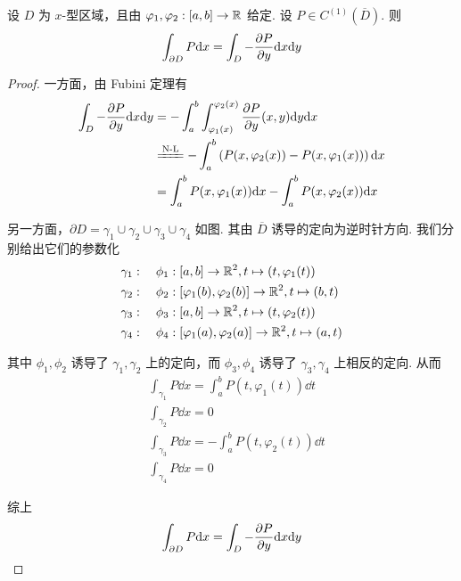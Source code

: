 \begin{lemma}
    设 $D$ 为 $x$-型区域，且由 $\varphi_1,\varphi_2:[a,b]\to\mathbb{R}$ 给定. 设 $P\in C^{(1)}(\overline{D})$. 则
$$
\int_{\partial D}P\mathrm{d} x=\int_D-\frac{\partial{P}}{\partial{y}}\mathrm{d} x\mathrm{d} y
$$
\end{lemma}
\begin{proof}
    一方面，由 Fubini 定理有
$$
\begin{aligned}
    \int_D-\pard{P}{y}\dd x\dd y&=-\int_a^b\int_{\varphi_1(x)}^{\varphi_2(x)}\pard{P}{y}(x,y)\dd y\dd x\\
    &\xlongequal{\text{N-L}}-\int_a^b\left(P(x,\varphi_2(x))-P(x,\varphi_1(x))\right)\dd x\\
    &=\int_a^b P(x,\varphi_1(x))\dd x-\int_a^b P(x,\varphi_2(x))\dd x
\end{aligned}
$$


    另一方面，$\partial D=\gamma_1\cup\gamma_2\cup\gamma_3\cup\gamma_4$ 如图. 其由 $\overline{D}$ 诱导的定向为逆时针方向. 我们分别给出它们的参数化
$$
\begin{aligned}
    &\gamma_1:\quad\phi_1:[a,b]\to\mathbb{R}^2,t\mapsto(t,\varphi_1(t))\\
    &\gamma_2:\quad\phi_2:[\varphi_1(b),\varphi_2(b)]\to\mathbb{R}^2,t\mapsto(b,t)\\
    &\gamma_3:\quad\phi_3:[a,b]\to\mathbb{R}^2,t\mapsto(t,\varphi_2(t))\\
    &\gamma_4:\quad\phi_4:[\varphi_1(a),\varphi_2(a)]\to\mathbb{R}^2,t\mapsto(a,t)\\
\end{aligned}
$$

    其中 $\phi_1,\phi_2$ 诱导了 $\gamma_1,\gamma_2$ 上的定向，而 $\phi_3,\phi_4$ 诱导了 $\gamma_3,\gamma_4$ 上相反的定向. 从而
$$
\begin{aligned}
    &\int_{\gamma_1}P\dd x=\int_a^bP(t,\varphi_1(t))\dd t\\
    &\int_{\gamma_2}P\dd x=0\\
    &\int_{\gamma_3}P\dd x=-\int_a^bP(t,\varphi_2(t))\dd t\\
    &\int_{\gamma_4}P\dd x=0
\end{aligned}
$$

    综上
$$
\int_{\partial D}P\mathrm{d} x=\int_D-\frac{\partial{P}}{\partial{y}}\mathrm{d} x\mathrm{d} y
$$
\end{proof}

